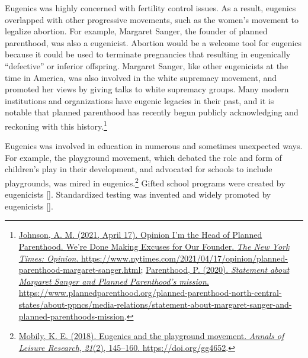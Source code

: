\documentclass[
  oneside,
  12pt]{crumpbook}
\begin{document}
Eugenics was highly concerned with fertility control issues. As a result, eugenics overlapped with other progressive movements, such as the women's movement to legalize abortion. For example, Margaret Sanger, the founder of planned parenthood, was also a eugenicist. Abortion would be a welcome tool for eugenics because it could be used to terminate pregnancies that resulting in eugenically ``defective'' or inferior offspring. Margaret Sanger, like other eugenicists at the time in America, was also involved in the white supremacy movement, and promoted her views by giving talks to white supremacy groups. Many modern institutions and organizations have eugenic legacies in their past, and it is notable that planned parenthood has recently begun publicly acknowledging and reckoning with this history.\footnote{\protect\hyperlink{ref-johnsonOpinionHeadPlanned2021}{Johnson, A. M. (2021, April 17). Opinion \textbar{} {I}'m the {Head} of {Planned Parenthood}. {We}'re {Done Making Excuses} for {Our Founder}. \emph{The New York Times: Opinion}. \url{https://www.nytimes.com/2021/04/17/opinion/planned-parenthood-margaret-sanger.html}}; \protect\hyperlink{ref-plannedparenthoodStatementMargaretSanger2020}{Parenthood, P. (2020). \emph{Statement about {Margaret Sanger} and {Planned Parenthood}'s mission}. \url{https://www.plannedparenthood.org/planned-parenthood-north-central-states/about-ppncs/media-relations/statement-about-margaret-sanger-and-planned-parenthoods-mission}}.}

Eugenics was involved in education in numerous and sometimes unexpected ways. For example, the playground movement, which debated the role and form of children's play in their development, and advocated for schools to include playgrounds, was mired in eugenics.\footnote{\protect\hyperlink{ref-mobilyEugenicsPlaygroundMovement2018}{Mobily, K. E. (2018). Eugenics and the playground movement. \emph{Annals of Leisure Research}, \emph{21}(2), 145--160. \url{https://doi.org/gg4652}}.} Gifted school programs were created by eugenicists {[}{]}. Standardized testing was invented and widely promoted by eugenicists {[}{]}.
\end{document}
